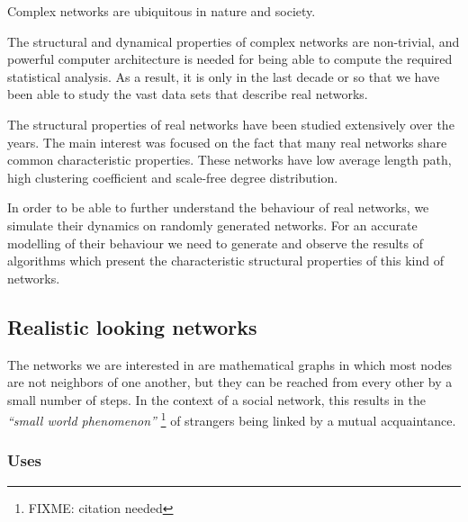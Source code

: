 \documentclass[a4paper,11pt,titlepage]{article}
\begin{document}
Complex networks are ubiquitous in nature and society.

The structural and dynamical properties of complex networks are
non-trivial, and powerful computer architecture is needed for being
able to compute the required statistical analysis. As a result, it is
only in the last decade or so that we have been able to study the vast
data sets that describe real networks.\cite{oconn11}

The structural properties of real networks have been studied
extensively over the years. The main interest was focused on the fact
that many real networks share common characteristic properties. These
networks have low average length path, high clustering coefficient and
scale-free degree distribution. \cite{oconn11}

In order to be able to further understand the behaviour of real
networks, we simulate their dynamics on randomly generated networks.
For an accurate modelling of their behaviour we need to generate and
observe the results of algorithms which present the characteristic
structural properties of this kind of networks. \cite{oconn11}

\subsection{Realistic looking networks}


The networks we are interested in are mathematical graphs in which
most nodes are not neighbors of one another, but they can be reached
from every other by a small number of steps. In the context of a
social network, this results in the \emph{``small world
  phenomenon''} \footnote{FIXME: citation needed} of strangers being
linked by a mutual acquaintance.

\subsubsection{Uses}

\end{document}
